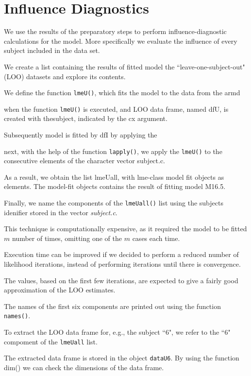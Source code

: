 \documentclass[a4paper,12pt]{article}
\begin{document}
\section{Influence Diagnostics}

We use the results of the preparatory steps to perform influence-diagnostic calculations for the model.
More specifically we evaluate the influence of every subject included in the data set.


We create a list containing the results of fitted model the ``leave-one-subject-out" (LOO)
datasets and explore its contents.

We define the function \texttt{lmeU()}, which fits the model to the data from the armd

when the function \texttt{lmeU()} is executed, and LOO data frame, named dfU, is created with thesubject, indicated by the cx argument.

Subsequently model is fitted by dfI by applying the 


next, with the help of the function \texttt{lapply()}, we apply the \texttt{lmeU()} to the consecutive elements of the character vector subject.c.

As a result, we obtain the list lmeUall, with lme-class model fit objects as elements. The model-fit objects contains the result of fitting model
M16.5.

Finally, we name the components of the \texttt{lmeUall()} list using the subjects idenifier stored in the vector \textit{subject.c}.

This technique is computationally expensive, as it required the model to be fitted $m$ number of times, omitting one of the $m$ cases each time.

Execution time can be improved if we decided to perform a reduced number of likelihood iterations, instead of performing iterations until there is convergence.

The values, based on the first few iterations, are expected to give a fairly good approximation of the LOO estimates.


The names of the first six components are printed out using the function \texttt{names()}.

To extract the LOO data frame for, e.g., the subject ``6", we refer to the ``6" compoment of the
\texttt{lmeUall} list.

The extracted data frame is stored in the object \texttt{dataU6}. By using the function dim() we can check the dimensions of the data frame.
\end{document}
